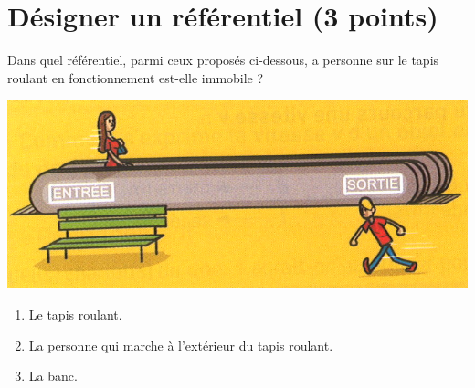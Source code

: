 \section{Désigner un référentiel (3 points)}
\begin{questions}
	
\question[3] Dans quel référentiel, parmi ceux proposés ci-dessous, a personne sur le tapis roulant en fonctionnement est-elle immobile ?
 
\end{questions}

\begin{multicols}{2}
	 
\includegraphics[scale=0.3]{tapis}
 
 \begin{enumerate}
 	\item Le tapis roulant.
 	\item La personne qui marche à l'extérieur du tapis roulant.
 	\item La banc. 
 \end{enumerate}



\end{multicols}
\fillwithdottedlines{3.5cm}